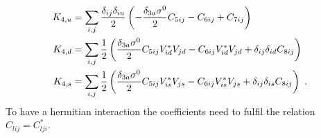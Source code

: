 \begin{align}
	K_{4,u} &= \sum_{i,j}\frac{\delta_{ij}\delta_{iu}}{2}\left(-\frac{\delta_{3a}\sigma^0}{2}C_{5ij} - C_{6ij} + C_{7ij}\right)\notag \\
	K_{4,d} &= \sum_{i,j}\frac{1}{2}\left(\frac{\delta_{3a}\sigma^0}{2}C_{5ij}V_{id}^*V_{jd} - C_{6ij}V_{id}^*V_{jd} + \delta_{ij}\delta_{id}C_{8ij}\right)\notag \\
	K_{4,s} &= \sum_{i,j}\frac{1}{2}\left(\frac{\delta_{3a}\sigma^0}{2}C_{5ij}V_{is}^*V_{js} - C_{6ij}V_{is}^*V_{js} + \delta_{ij}\delta_{is}C_{8ij}\right) \ .
\end{align}
To have a hermitian interaction the coefficients need to fulfil the relation $C_{lij} = C_{lji}^*$.